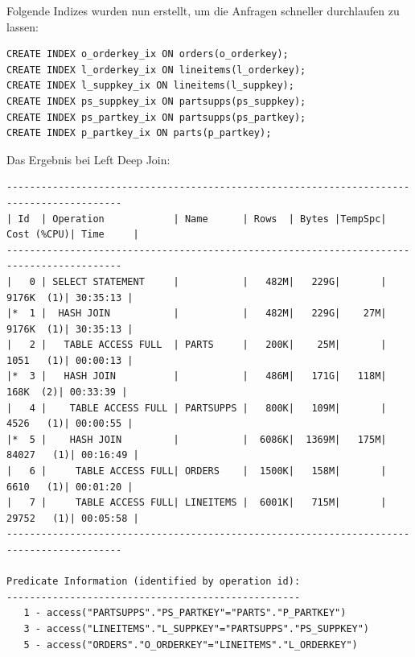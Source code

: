 \documentclass[10pt]{article}
\begin{document}
Folgende Indizes wurden nun erstellt, um die Anfragen schneller durchlaufen zu lassen:
\begin{lstlisting}[style=sql]
CREATE INDEX o_orderkey_ix ON orders(o_orderkey);
CREATE INDEX l_orderkey_ix ON lineitems(l_orderkey);
CREATE INDEX l_suppkey_ix ON lineitems(l_suppkey);
CREATE INDEX ps_suppkey_ix ON partsupps(ps_suppkey);
CREATE INDEX ps_partkey_ix ON partsupps(ps_partkey);
CREATE INDEX p_partkey_ix ON parts(p_partkey);
\end{lstlisting}
Das Ergebnis bei Left Deep Join:
\begin{lstlisting}[style=queryexecutionplan]
------------------------------------------------------------------------------------------
| Id  | Operation            | Name      | Rows  | Bytes |TempSpc| Cost (%CPU)| Time     |
------------------------------------------------------------------------------------------
|   0 | SELECT STATEMENT     |           |   482M|   229G|       |  9176K  (1)| 30:35:13 |
|*  1 |  HASH JOIN           |           |   482M|   229G|    27M|  9176K  (1)| 30:35:13 |
|   2 |   TABLE ACCESS FULL  | PARTS     |   200K|    25M|       |  1051   (1)| 00:00:13 |
|*  3 |   HASH JOIN          |           |   486M|   171G|   118M|   168K  (2)| 00:33:39 |
|   4 |    TABLE ACCESS FULL | PARTSUPPS |   800K|   109M|       |  4526   (1)| 00:00:55 |
|*  5 |    HASH JOIN         |           |  6086K|  1369M|   175M| 84027   (1)| 00:16:49 |
|   6 |     TABLE ACCESS FULL| ORDERS    |  1500K|   158M|       |  6610   (1)| 00:01:20 |
|   7 |     TABLE ACCESS FULL| LINEITEMS |  6001K|   715M|       | 29752   (1)| 00:05:58 |
------------------------------------------------------------------------------------------
 
Predicate Information (identified by operation id):
---------------------------------------------------
   1 - access("PARTSUPPS"."PS_PARTKEY"="PARTS"."P_PARTKEY")
   3 - access("LINEITEMS"."L_SUPPKEY"="PARTSUPPS"."PS_SUPPKEY")
   5 - access("ORDERS"."O_ORDERKEY"="LINEITEMS"."L_ORDERKEY")
\end{lstlisting}
\end{document}
